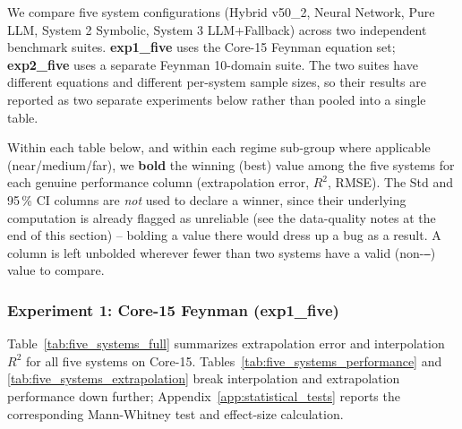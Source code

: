 \documentclass[twoside,11pt]{article}
\begin{document}
We compare five system configurations (Hybrid v50\_2, Neural Network, Pure
LLM, System 2 Symbolic, System 3 LLM+Fallback) across two independent
benchmark suites. \textbf{exp1\_five} uses the Core-15 Feynman equation set;
\textbf{exp2\_five} uses a separate Feynman 10-domain suite. The two suites
have different equations and different per-system sample sizes, so their
results are reported as two separate experiments below rather than pooled
into a single table.

Within each table below, and within each regime sub-group where applicable
(near/medium/far), we \textbf{bold} the winning (best) value among the five
systems for each genuine performance column (extrapolation error, $R^2$,
RMSE). The Std and 95\,\% CI columns are \emph{not} used to declare a winner,
since their underlying computation is already flagged as unreliable (see the
data-quality notes at the end of this section) -- bolding a value there would
dress up a bug as a result. A column is left unbolded wherever fewer than two
systems have a valid (non-\texttt{---}) value to compare.

\subsubsection{Experiment 1: Core-15 Feynman (exp1\_five)}\label{subsubsec:five-system-exp1}

Table~\ref{tab:five_systems_full} summarizes extrapolation error
and interpolation $R^2$ for all five systems on Core-15. Tables~\ref{tab:five_systems_performance}
and \ref{tab:five_systems_extrapolation} break interpolation and extrapolation
performance down further; Appendix~\ref{app:statistical_tests} reports
the corresponding Mann-Whitney test and effect-size calculation.
\end{document}
